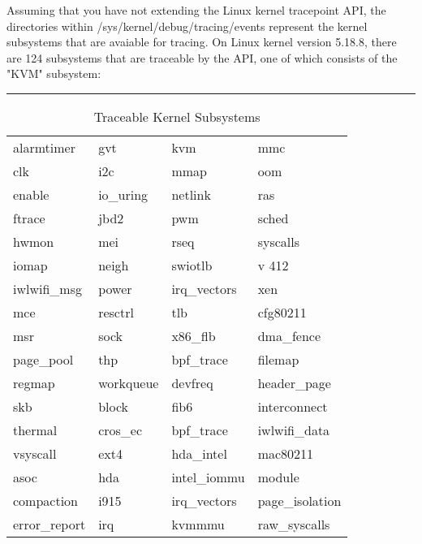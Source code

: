 \documentclass{report}
\begin{document}
\begin{spacing}{1.5}
{\large
Assuming that you have not extending the Linux kernel tracepoint API, the directories within /sys/kernel/debug/tracing/events represent the kernel subsystems that are avaiable for tracing. On Linux kernel version 5.18.8, there are 124 subsystems that are traceable by the API, one of which consists of the "KVM" subsystem:
\leavevmode\newline
}

{\normalsize
\noindent\rule{15.5cm}{0.4pt}
\begin{longtable}{llll}
\caption{Traceable Kernel Subsystems} \\
alarmtimer                  & gvt              & kvm              & mmc \\
clk                         & i2c              & mmap             & oom \\ 
enable                      & io\_uring         & netlink          & ras \\
ftrace                      & jbd2             & pwm              & sched \\
hwmon                       & mei              & rseq             & syscalls \\
iomap                       & neigh            & swiotlb          & v 412 \\
iwlwifi\_msg                 & power            & irq\_vectors      & xen \\
mce                         & resctrl          & tlb              & cfg80211 \\
msr                         & sock             & x86\_flb          & dma\_fence \\
page\_pool                   & thp              & bpf\_trace        & filemap \\
regmap                      & workqueue        & devfreq          & header\_page \\
skb                         & block            & fib6             & interconnect \\
thermal                     & cros\_ec          & bpf\_trace        & iwlwifi\_data \\
vsyscall                    & ext4             & hda\_intel        & mac80211 \\
asoc                        & hda              & intel\_iommu      & module \\
compaction                  & i915             & irq\_vectors      & page\_isolation \\
error\_report                & irq              & kvmmmu           & raw\_syscalls \\

\end{longtable}}
\end{spacing}
\end{document}
